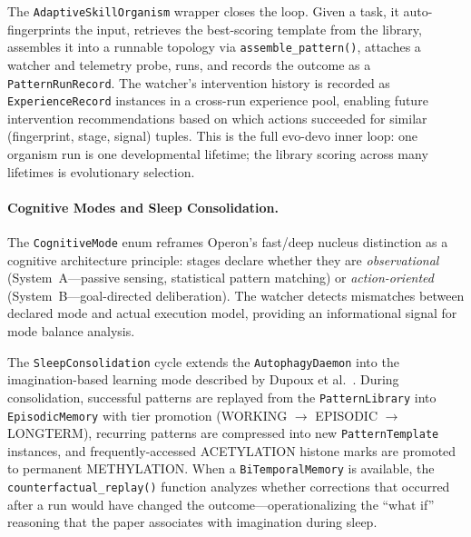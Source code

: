 The \texttt{AdaptiveSkillOrganism} wrapper closes the loop. Given a task, it auto-fingerprints the input, retrieves the best-scoring template from the library, assembles it into a runnable topology via \texttt{assemble\_pattern()}, attaches a watcher and telemetry probe, runs, and records the outcome as a \texttt{PatternRunRecord}. The watcher's intervention history is recorded as \texttt{ExperienceRecord} instances in a cross-run experience pool, enabling future intervention recommendations based on which actions succeeded for similar (fingerprint, stage, signal) tuples. This is the full evo-devo inner loop: one organism run is one developmental lifetime; the library scoring across many lifetimes is evolutionary selection.

\paragraph{Cognitive Modes and Sleep Consolidation.}
\label{sec:cognitive-modes}
The \texttt{CognitiveMode} enum reframes Operon's fast/deep nucleus distinction as a cognitive architecture principle: stages declare whether they are \emph{observational} (System~A---passive sensing, statistical pattern matching) or \emph{action-oriented} (System~B---goal-directed deliberation). The watcher detects mismatches between declared mode and actual execution model, providing an informational signal for mode balance analysis.

The \texttt{SleepConsolidation} cycle extends the \texttt{AutophagyDaemon} into the imagination-based learning mode described by Dupoux et al.~\cite{dupoux2026learning}. During consolidation, successful patterns are replayed from the \texttt{PatternLibrary} into \texttt{EpisodicMemory} with tier promotion (WORKING $\to$ EPISODIC $\to$ LONGTERM), recurring patterns are compressed into new \texttt{PatternTemplate} instances, and frequently-accessed ACETYLATION histone marks are promoted to permanent METHYLATION. When a \texttt{BiTemporalMemory} is available, the \texttt{counterfactual\_replay()} function analyzes whether corrections that occurred after a run would have changed the outcome---operationalizing the ``what if'' reasoning that the paper associates with imagination during sleep.

